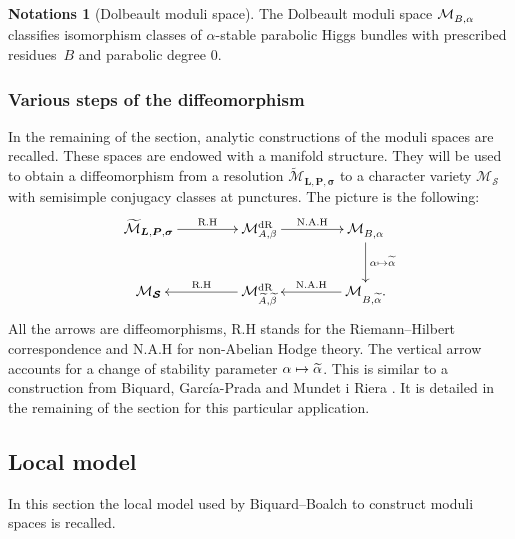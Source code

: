 \documentclass[11pt]{article}
\newcommand\mto{\mathchoice{\longmapsto}{\mapsto}{\mapsto}{\mapsto}}
\newcommand{\NoChangel}[1]{%
\expandafter\let\csname old\string#1\endcsname=#1
\let#1=\relax
\newcommand{#1}{\mathcode`l="716C\csname old\string#1\endcsname\mathcode`l="7160 }%
}
\newcommand{\Dol}{\mathrm{Dol}}\NoChangel{\Dol}
\newcommand{\dR}{\mathrm{dR}}
\theoremstyle{definition}
\newtheorem{notations}[definition]{Notations}
\theoremstyle{plain}
\begin{document}
\begin{notations}[Dolbeault moduli space]
The Dolbeault moduli space $\mathcal{M}^{\Dol}_{B,\alpha}$ classifies isomorphism classes of
$\alpha$-stable parabolic Higgs bundles with prescribed residues~$B$ and parabolic degree $0$.
\end{notations}

\subsubsection{Various steps of the diffeomorphism}\label{sect_analytic_moduli}
In the remaining of the section, analytic constructions of the moduli spaces are recalled. These spaces are endowed with a manifold structure. They will be used to obtain a diffeomorphism from a resolution $\widetilde{\mathcal{M}}_{\boldsymbol{L},\boldsymbol{P}, \boldsymbol{\sigma}}$ to a character variety $\mathcal{M}_{\boldsymbol{\mathcal{S}}}$ with semisimple conjugacy classes at punctures. The picture is the following:
\begin{equation}\label{diagram_path_ch4}
\begin{array}{c}
\xymatrix@C=1.5cm{
\widetilde{\mathcal{M}}_{\boldsymbol{L},\boldsymbol{P}, \boldsymbol{\sigma}} \ar[r]^-{\text{R.H}} & \mathcal{M}^{\dR}_{A,\beta} \ar[r]^-{\text{N.A.H}} & \mathcal{M}^{\Dol}_{B,\alpha} \ar[d]^{\alpha\mto \widetilde{\alpha}}\\
\mathcal{M}_{\boldsymbol{\mathcal{S}}} & \ar[l]_-{\text{R.H}} \mathcal{M}^{\dR}_{\widetilde{A},\widetilde{\beta}} &\ar[l]_-{\text{N.A.H}} \mathcal{M}^{\Dol}_{B,\widetilde{\alpha}}.
}
\end{array}
\end{equation}
All the arrows are diffeomorphisms, R.H stands for the Riemann--Hilbert correspondence and N.A.H for non-Abelian Hodge theory. The vertical arrow accounts for a change of stability parameter $\alpha\mto\widetilde{\alpha}$. This is similar to a construction from Biquard, García-Prada and Mundet i Riera \cite[Th.\,7.10]{Biquard_Garcia_Prada_Riera}. It is detailed in the remaining of the section for this particular application.

\subsection{Local model}\label{subsect_local_model}
In this section the local model used by Biquard--Boalch \cite{Biquard_Boalch_2004} to construct moduli spaces is recalled.
\end{document}
